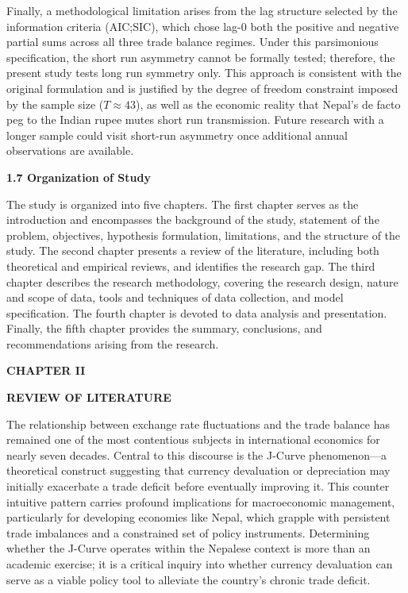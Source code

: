 \documentclass[12pt]{article}
\begin{document}
Finally, a methodological limitation arises from the lag structure selected by the information criteria (AIC;SIC), which chose lag-0 both the positive and negative partial sums across all three trade balance regimes. Under this parsimonious specification, the short run asymmetry cannot be formally tested; therefore, the present study tests long run symmetry only. This approach is consistent with the original \textcite{Shin2014-ap} formulation and is justified by the degree of freedom constraint imposed by the sample size ($T \approx 43$), as well as the economic reality that Nepal's de facto peg to the Indian rupee mutes short run transmission. Future research with a longer sample could visit short-run asymmetry once additional annual observations are available.


\vspace{0.5cm}
\noindent\textbf{1.7 Organization of Study}

The study is organized into five chapters. The first chapter serves as the introduction and encompasses the background of the study, statement of the problem, objectives, hypothesis formulation, limitations, and the structure of the study. The second chapter presents a review of the literature, including both theoretical and empirical reviews, and identifies the research gap. The third chapter describes the research methodology, covering the research design, nature and scope of data, tools and techniques of data collection, and model specification. The fourth chapter is devoted to data analysis and presentation. Finally, the fifth chapter provides the summary, conclusions, and recommendations arising from the research.

\newpage
\begin{center}
\textbf{CHAPTER II}
\end{center}
\begin{center}
\textbf{REVIEW OF LITERATURE}
\end{center}

The relationship between exchange rate fluctuations and the trade balance has remained one of the most contentious subjects in international economics for nearly seven decades. Central to this discourse is the J-Curve phenomenon—a theoretical construct suggesting that currency devaluation or depreciation may initially exacerbate a trade deficit before eventually improving it. This counter intuitive pattern carries profound implications for macroeconomic management, particularly for developing economies like Nepal, which grapple with persistent trade imbalances and a constrained set of policy instruments. Determining whether the J-Curve operates within the Nepalese context is more than an academic exercise; it is a critical inquiry into whether currency devaluation can serve as a viable policy tool to alleviate the country's chronic trade deficit.
\end{document}
